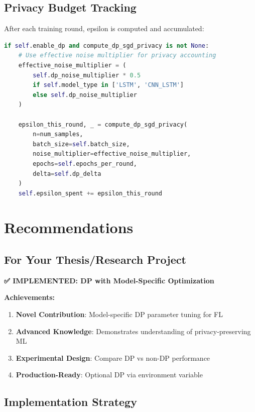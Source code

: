 \documentclass[12pt,a4paper]{article}
\begin{document}
\subsection{Privacy Budget Tracking}

After each training round, epsilon is computed and accumulated:

\begin{lstlisting}[language=Python, basicstyle=\small]
if self.enable_dp and compute_dp_sgd_privacy is not None:
    # Use effective noise multiplier for privacy accounting
    effective_noise_multiplier = (
        self.dp_noise_multiplier * 0.5 
        if self.model_type in ['LSTM', 'CNN_LSTM'] 
        else self.dp_noise_multiplier
    )
    
    epsilon_this_round, _ = compute_dp_sgd_privacy(
        n=num_samples,
        batch_size=self.batch_size,
        noise_multiplier=effective_noise_multiplier,
        epochs=self.epochs_per_round,
        delta=self.dp_delta
    )
    self.epsilon_spent += epsilon_this_round
\end{lstlisting}

\section{Recommendations}

\subsection{For Your Thesis/Research Project}

\textbf{✅ IMPLEMENTED: DP with Model-Specific Optimization}

\textbf{Achievements:}
\begin{enumerate}
    \item \textbf{Novel Contribution}: Model-specific DP parameter tuning for FL
    \item \textbf{Advanced Knowledge}: Demonstrates understanding of privacy-preserving ML
    \item \textbf{Experimental Design}: Compare DP vs non-DP performance
    \item \textbf{Production-Ready}: Optional DP via environment variable
\end{enumerate}

\subsection{Implementation Strategy}
\end{document}

